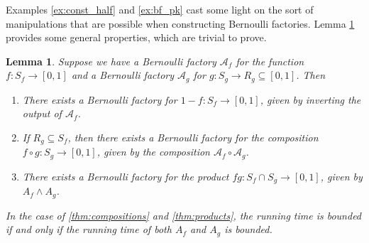 \documentclass{article}
\newtheorem{lemma}{Lemma}
\theoremstyle{definition}
\newcommand{\A}{\mathcal{A}}
\begin{document}
Examples \ref{ex:const_half} and \ref{ex:bf_pk} cast some light on the sort of manipulations that are possible when constructing Bernoulli factories. Lemma \ref{thm:products_compositions} provides some general properties, which are trivial to prove.

\begin{lemma}\label{thm:products_compositions}
Suppose we have a Bernoulli factory $\A_f$ for the function $f:S_f\to[0,1]$ and a Bernoulli factory $\A_g$ for $g:S_g\to R_g\subseteq[0,1]$. Then
\begin{enumerate}[label=(\alph*)]
\item There exists a Bernoulli factory for $1-f : S_f \to [0,1]$, given by inverting the output of $\A_f$.
\item \label{thm:compositions} If $R_g \subseteq S_f$, then there exists a Bernoulli factory for the composition $f\circ g: S_g \to [0,1]$, given by the composition $\A_f \circ \A_g$.
\item \label{thm:products} There exists a Bernoulli factory for the product $fg:S_f \cap S_g \to [0,1]$, given by $A_f \wedge A_g$.
\end{enumerate}
In the case of \ref{thm:compositions} and \ref{thm:products}, the running time is bounded if and only if the running time of both $A_f$ and $A_g$ is bounded.
\end{lemma}


\end{document}
